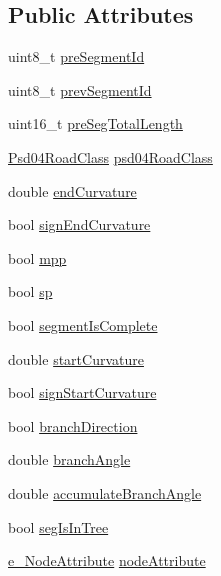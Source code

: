 \subsection*{Public Attributes}
\begin{DoxyCompactItemize}
\item 
uint8\+\_\+t \hyperlink{struct_psd_map_data_a05964b04396fbe60313638b68146409c}{pre\+Segment\+Id}
\item 
uint8\+\_\+t \hyperlink{struct_psd_map_data_a7f96bd3b8eaffbbfa479fc218951a18e}{prev\+Segment\+Id}
\item 
uint16\+\_\+t \hyperlink{struct_psd_map_data_aff96ab7a862bbb292f8b97891f95cfe5}{pre\+Seg\+Total\+Length}
\item 
\hyperlink{_psd_message_decoder_8h_a39044ce168ac526920bc721a8dc702b9}{Psd04\+Road\+Class} \hyperlink{struct_psd_map_data_ab3d6bede9882ba6c46776e493a8d312e}{psd04\+Road\+Class}
\item 
double \hyperlink{struct_psd_map_data_ab8b6fcfdb85cd9041b4c1d6557b73cf1}{end\+Curvature}
\item 
bool \hyperlink{struct_psd_map_data_ae27e54d6d968caec9488192a5ef020b3}{sign\+End\+Curvature}
\item 
bool \hyperlink{struct_psd_map_data_a7660ef05fe24afd46c2a2588844daf66}{mpp}
\item 
bool \hyperlink{struct_psd_map_data_a733402b0de1cb1d31e433ca7d9da2e99}{sp}
\item 
bool \hyperlink{struct_psd_map_data_adbdd4923256006ea09ea96cdb1e1df21}{segment\+Is\+Complete}
\item 
double \hyperlink{struct_psd_map_data_ae478c00c2ea8dc9b99ed23b4b5327cce}{start\+Curvature}
\item 
bool \hyperlink{struct_psd_map_data_ad888b35e0757aaf8edb6afd246a5ed6f}{sign\+Start\+Curvature}
\item 
bool \hyperlink{struct_psd_map_data_a41ac719f3013692691e22e24329f9725}{branch\+Direction}
\item 
double \hyperlink{struct_psd_map_data_ae032895a5e9238f14ba4a63264c24334}{branch\+Angle}
\item 
double \hyperlink{struct_psd_map_data_a843771a8237479d2fb51be8583e8324c}{accumulate\+Branch\+Angle}
\item 
bool \hyperlink{struct_psd_map_data_ae027448738c569007b8b58951532da4b}{seg\+Is\+In\+Tree}
\item 
\hyperlink{_psd_message_decoder_8h_aa38e8413bd76f11962a364459c725e06}{e\+\_\+\+Node\+Attribute} \hyperlink{struct_psd_map_data_a6112249db6720d9fd94a9a06f5d9b926}{node\+Attribute}

\end{DoxyCompactItemize}
